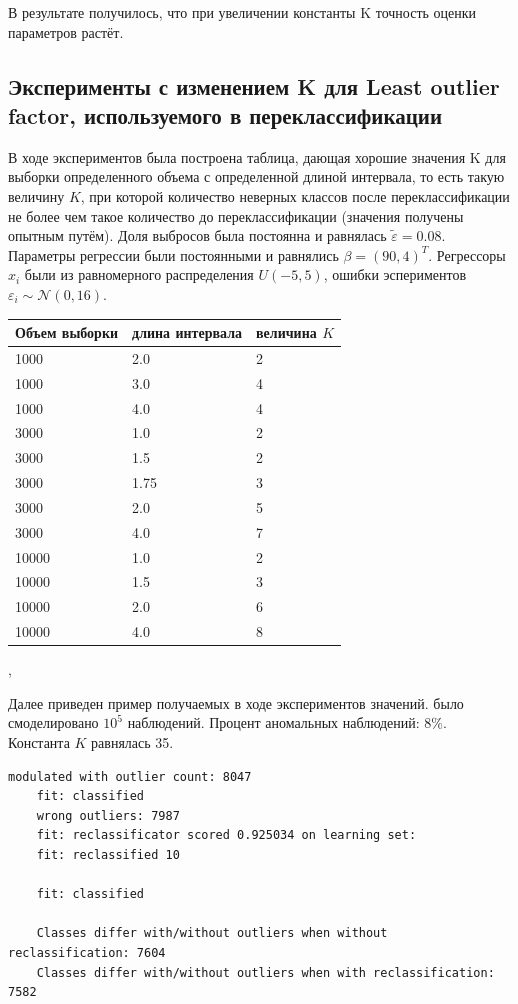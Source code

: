 В результате получилось, что при увеличении константы K точность оценки параметров растёт. 

\subsection{Эксперименты с изменением K для Least outlier factor, используемого в переклассификации}\label{ss3_3_2}
В ходе экспериментов была построена таблица, дающая хорошие значения K для выборки определенного объема с определенной длиной интервала, то есть такую величину $K$, при которой количество неверных классов после переклассификации не более чем такое количество до переклассификации (значения получены опытным путём).
Доля выбросов была постоянна и равнялась $\widetilde{\varepsilon}=0.08$. Параметры регрессии были постоянными и равнялись $\beta=(90,4)^T$. 
Регрессоры $x_i$ были из равномерного распределения $U(-5,5)$, ошибки эспериментов $\varepsilon_i\sim \mathcal{N}(0,16)$.

\begin{center}
    \label{tab2}
    \begin{tabular}{|p{5cm}|p{5cm}|p{5cm}|}
        \hline
        Объем выборки&длина интервала& величина $K$\\
        \hline
        1000 & 2.0 & 2\\
        1000 & 3.0 & 4\\
        1000 & 4.0 & 4\\

        3000 & 1.0 & 2\\
        3000 & 1.5 & 2\\
        3000 & 1.75 & 3\\
        3000 & 2.0 & 5\\
        3000 & 4.0 & 7\\

        10000 & 1.0 & 2\\
        10000 & 1.5 & 3\\
        10000 & 2.0 & 6\\
        10000 & 4.0 & 8\\
        \hline
    \end{tabular},
\end{center}
Далее приведен пример получаемых в ходе экспериментов значений.
было смоделировано $10^5$ наблюдений. Процент аномальных наблюдений: $8\%$. Константа $K$ равнялась 35.
\begin{Verbatim}[fontsize=\scriptsize]
    modulated with outlier count: 8047
    fit: classified
    wrong outliers: 7987
    fit: reclassificator scored 0.925034 on learning set:
    fit: reclassified 10
    
    fit: classified
    
    Classes differ with/without outliers when without reclassification: 7604
    Classes differ with/without outliers when with reclassification: 7582
\end{Verbatim}

